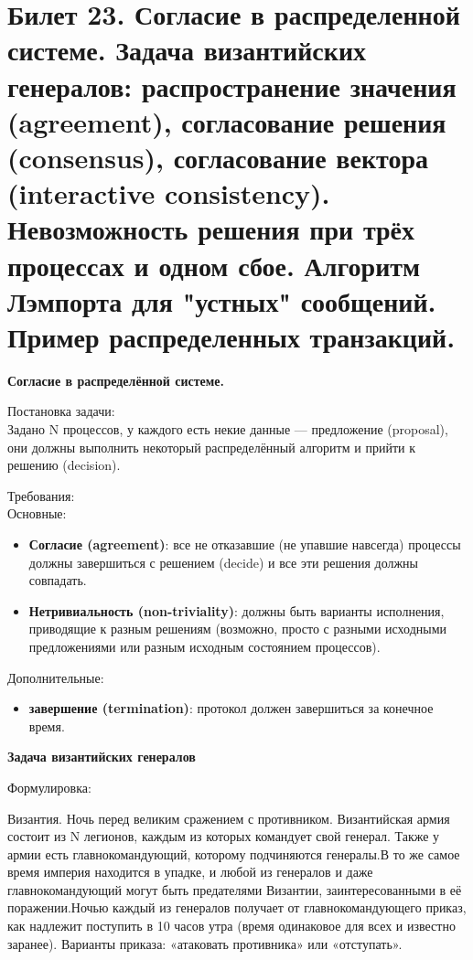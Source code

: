 \newpage
\section{Билет 23. Согласие в распределенной системе. Задача византийских генералов: распространение значения (agreement), согласование решения (consensus), согласование вектора (interactive consistency). Невозможность решения при трёх процессах и одном сбое. Алгоритм Лэмпорта для "устных" сообщений. Пример распределенных транзакций.}

\textbf{Согласие в распределённой системе.} 

Постановка задачи: \\
Задано N процессов, у каждого есть некие данные — предложение (proposal), они должны выполнить некоторый распределённый алгоритм и прийти к решению (decision).

Требования: \\
Основные:
\begin{itemize}
\item \textbf{Согласие (agreement)}: все не отказавшие (не упавшие навсегда) процессы должны завершиться с решением (decide) и все эти решения должны совпадать.
\item \textbf{Нетривиальность (non-triviality)}: должны быть варианты исполнения, приводящие к разным решениям (возможно, просто с разными исходными предложениями или разным исходным состоянием процессов).
\end{itemize}
Дополнительные: 
\begin{itemize}
\item \textbf{завершение (termination)}: протокол должен завершиться за конечное время.
\end{itemize}

\hypertarget{Byzantine_fault} {\textbf{Задача византийских генералов} }

Формулировка: 

Византия. Ночь перед великим сражением с противником. Византийская армия состоит из N легионов, каждым из которых командует свой генерал. Также у армии есть главнокомандующий, которому подчиняются генералы.В то же самое время империя находится в упадке, и любой из генералов и даже главнокомандующий могут быть предателями Византии, заинтересованными в её поражении.Ночью каждый из генералов получает от главнокомандующего приказ, как надлежит поступить в 10 часов утра (время одинаковое для всех и известно заранее). Варианты приказа: «атаковать противника» или «отступать».

